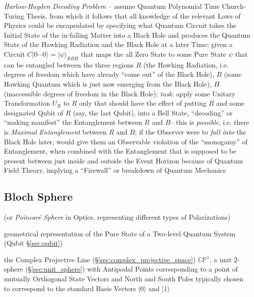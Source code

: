 \emph{Harlow-Hayden Decoding Problem} -- assume Quantum Polynomial Time
Church-Turing Thesis, from which it follows that all knowledge of the relevant
Laws of Physics could be encapsulated by specifying what Quantum Circuit takes
the Initial State of the in-falling Matter into a Black Hole and produces the
Quantum State of the Hawking Radiation and the Black Hole at a later Time; given
a Circuit $C|0 \cdots 0\rangle = |\psi\rangle_{RBH}$ that maps the all Zero
State to some Pure State $\psi$ that can be entangled between the three regions
$R$ (the Hawking Radiation, i.e. degrees of freedom which have already ``come
out'' of the Black Hole), $B$ (some Hawking Quantum which is just now emerging
from the Black Hole), $H$ (inaccessible degrees of freedom in the Black Hole);
\emph{task}: apply some Unitary Transformation $U_R$ to $R$ only that should
have the effect of putting $B$ and some designated Qubit of $R$ (say, the last
Qubit), into a Bell State, ``decoding'' or ``making manifest'' the Entanglement
between $R$ and $B$-- this is \emph{possible}, i.e. there is \emph{Maximal
  Entanglement} between $R$ and $B$; if the Observer were to \emph{fall into}
the Black Hole later, would give them an Observable violation of the
``monogamy'' of Entanglement, when combined with the Entanglement that is
supposed to be present between just inside and outside the Event Horizon because
of Quantum Field Theory, implying a ``Firewall'' or breakdown of Quantum
Mechanics



\subsection{Bloch Sphere}\label{sec:bloch_sphere}

(or \emph{Poincar\'e Sphere} in Optics, representing different types of
Polarizations)

geometrical representation of the Pure State of a Two-level Quantum System
(Qubit \S\ref{sec:qubit})

the Complex Projective Line (\S\ref{sec:complex_projective_space})
$\mathbb{CP}^1$, a unit $2$-sphere (\S\ref{sec:unit_sphere}) with Antipodal
Points corresponding to a point of mutually Orthogonal State Vectors and North
and South Poles typically chosen to correspond to the standard Basis Vectors
$|0\rangle$ and $|1\rangle$

